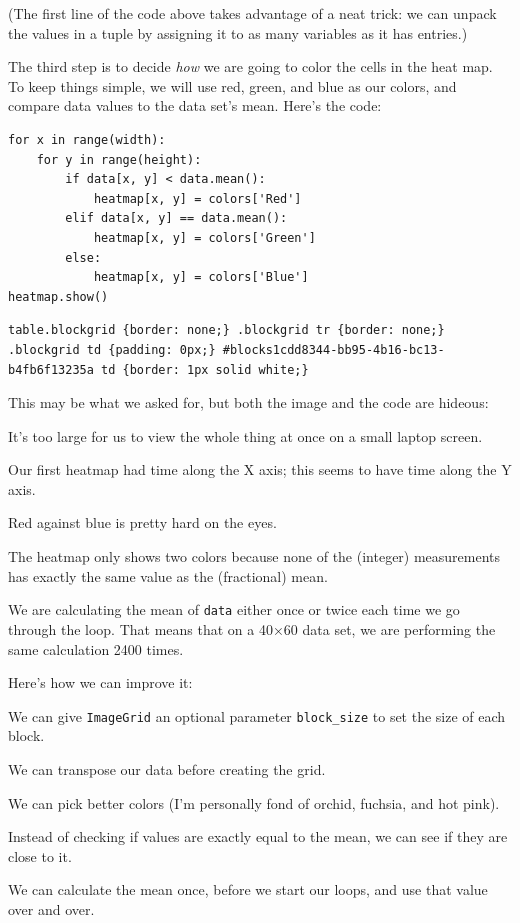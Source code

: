 \documentclass{book}
\begin{document}
(The first line of the code above takes advantage of a neat trick: we
can unpack the values in a tuple by assigning it to as many variables as
it has entries.)

The third step is to decide \emph{how} we are going to color the cells
in the heat map. To keep things simple, we will use red, green, and blue
as our colors, and compare data values to the data set's mean. Here's
the code:

\begin{verbatim}
for x in range(width):
    for y in range(height):
        if data[x, y] < data.mean():
            heatmap[x, y] = colors['Red']
        elif data[x, y] == data.mean():
            heatmap[x, y] = colors['Green']
        else:
            heatmap[x, y] = colors['Blue']
heatmap.show()
\end{verbatim}

\begin{verbatim}
table.blockgrid {border: none;} .blockgrid tr {border: none;} .blockgrid td {padding: 0px;} #blocks1cdd8344-bb95-4b16-bc13-b4fb6f13235a td {border: 1px solid white;}
\end{verbatim}

This may be what we asked for, but both the image and the code are
hideous:

\begin{swcenumerate}
\item
  It's too large for us to view the whole thing at once on a small
  laptop screen.
\item
  Our first heatmap had time along the X axis; this seems to have time
  along the Y axis.
\item
  Red against blue is pretty hard on the eyes.
\item
  The heatmap only shows two colors because none of the (integer)
  measurements has exactly the same value as the (fractional) mean.
\item
  We are calculating the mean of \texttt{data} either once or twice each
  time we go through the loop. That means that on a 40×60 data set, we
  are performing the same calculation 2400 times.
\end{swcenumerate}

Here's how we can improve it:

\begin{swcenumerate}
\item
  We can give \texttt{ImageGrid} an optional parameter
  \texttt{block\_size} to set the size of each block.
\item
  We can transpose our data before creating the grid.
\item
  We can pick better colors (I'm personally fond of orchid, fuchsia, and
  hot pink).
\item
  Instead of checking if values are exactly equal to the mean, we can
  see if they are close to it.
\item
  We can calculate the mean once, before we start our loops, and use
  that value over and over.
\end{swcenumerate}
\end{document}
